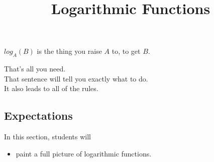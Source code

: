 \documentclass{ximera}
\title{Logarithmic Functions}
\begin{document}
\begin{abstract}
\end{abstract}
\maketitle





\begin{center}
$log_A(B)$ is the thing you raise $A$ to, to get $B$.
\end{center}


That's all you need. \\

That sentence will tell you exactly what to do. \\

It also leads to all of the rules.










\subsection{Expectations}


\begin{sectionOutcomes}
In this section, students will 

\begin{itemize}
\item paint a full picture of logarithmic functions.
\end{itemize}
\end{sectionOutcomes}
\end{document}
